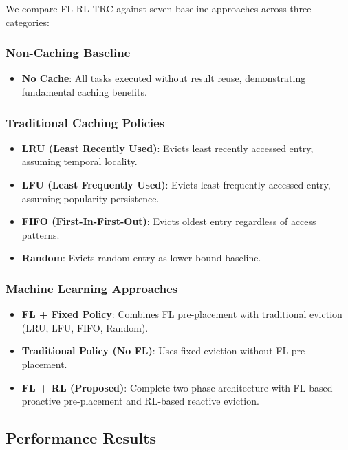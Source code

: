 We compare FL-RL-TRC against seven baseline approaches across three categories:

\subsubsection{Non-Caching Baseline}
\begin{itemize}
    \item \textbf{No Cache}: All tasks executed without result reuse, demonstrating fundamental caching benefits.
\end{itemize}

\subsubsection{Traditional Caching Policies}
\begin{itemize}
    \item \textbf{LRU (Least Recently Used)}: Evicts least recently accessed entry, assuming temporal locality.
    \item \textbf{LFU (Least Frequently Used)}: Evicts least frequently accessed entry, assuming popularity persistence.
    \item \textbf{FIFO (First-In-First-Out)}: Evicts oldest entry regardless of access patterns.
    \item \textbf{Random}: Evicts random entry as lower-bound baseline.
\end{itemize}

\subsubsection{Machine Learning Approaches}
\begin{itemize}
    \item \textbf{FL + Fixed Policy}: Combines FL pre-placement with traditional eviction (LRU, LFU, FIFO, Random).
    \item \textbf{Traditional Policy (No FL)}: Uses fixed eviction without FL pre-placement.
    \item \textbf{FL + RL (Proposed)}: Complete two-phase architecture with FL-based proactive pre-placement and RL-based reactive eviction.
\end{itemize}

\subsection{Performance Results}

